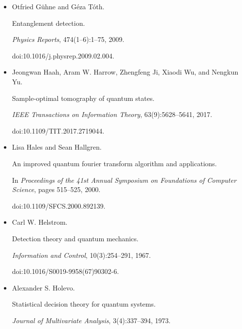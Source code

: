 \documentclass[10pt,a4paper]{article}
\begin{document}
\begin{itemize}
doi:10.1103/PhysRevA.76.030305.





\item[] 
[20]

Otfried Gühne and Géza Tóth.


Entanglement detection.


\emph{Physics Reports}, 474(1–6):1–75, 2009.


doi:10.1016/j.physrep.2009.02.004.





\item[] 
[21]

Jeongwan Haah, Aram W. Harrow, Zhengfeng Ji, Xiaodi Wu, and Nengkun Yu.


Sample-optimal tomography of quantum states.


\emph{IEEE Transactions on Information Theory}, 63(9):5628–5641,
2017.


doi:10.1109/TIT.2017.2719044.





\item[] 
[22]

Lisa Hales and Sean Hallgren.


An improved quantum fourier transform algorithm and applications.


In \emph{Proceedings of the 41st Annual Symposium on Foundations of
Computer Science}, pages 515–525, 2000.


doi:10.1109/SFCS.2000.892139.





\item[] 
[23]

Carl W. Helstrom.


Detection theory and quantum mechanics.


\emph{Information and Control}, 10(3):254–291, 1967.


doi:10.1016/S0019-9958(67)90302-6.





\item[] 
[24]

Alexander S. Holevo.


Statistical decision theory for quantum systems.


\emph{Journal of Multivariate Analysis}, 3(4):337–394, 1973.



\end{itemize}
\end{document}
